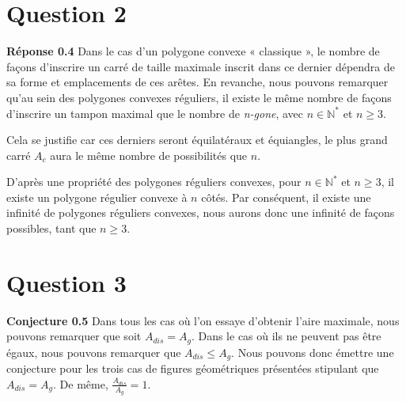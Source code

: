\documentclass[]{amsart}
\theoremstyle{definition}
\theoremstyle{remark}
\numberwithin{equation}{section}
\begin{document}
\begin{center}
\end{center}

\section*{Question 2}

\textbf{Réponse 0.4} Dans le cas d'un polygone convexe « classique », le nombre de façons d'inscrire un carré de taille maximale inscrit dans ce dernier dépendra de sa forme et emplacements de ces arêtes. En revanche, nous pouvons remarquer qu'au sein des polygones convexes réguliers, il existe le même nombre de façons d'inscrire un tampon maximal que le nombre de \emph{n-gone}, avec $n \in\mathbb{N_{}^{\ast}}$ et $n \geq 3$.

Cela se justifie car ces derniers seront équilatéraux et équiangles, le plus grand carré $A_c$ aura le même nombre de possibilités que $n$.

D'après une propriété des polygones réguliers convexes, pour $n \in\mathbb{N_{}^{\ast}}$ et $n \geq 3$, il existe un polygone régulier convexe à $n$ côtés. Par conséquent, il existe une infinité de polygones réguliers convexes, nous aurons donc une infinité de façons possibles, tant que $n \geq 3$. 

\section*{Question 3}
\textbf{Conjecture 0.5} Dans tous les cas où l’on essaye d’obtenir l’aire maximale, nous pouvons remarquer que soit $A_{dis} = A_{g}$. Dans le cas où ils ne peuvent pas être égaux, nous pouvons remarquer que $A_{dis} \leq A_g$. Nous pouvons donc émettre une conjecture pour les trois cas de figures géométriques présentées stipulant que $A_{dis} = A_{g}$. De même, $\frac{A_{dis}}{A_g} = 1$.
\end{document}
